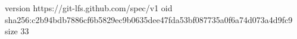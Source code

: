 version https://git-lfs.github.com/spec/v1
oid sha256:c2b94bdb7886cf6b5829ec9b0635dee47fda53bf087735a0f6a74d073a4d9fc9
size 33
